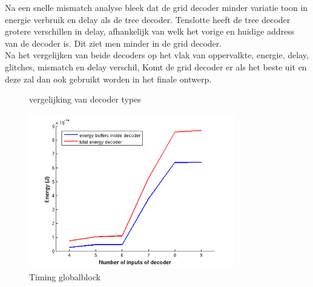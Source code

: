 Na een snelle mismatch analyse bleek dat de grid decoder minder variatie toon in energie verbruik en delay als de tree decoder. Tenslotte heeft de tree decoder grotere verschillen in delay, afhankelijk van welk het vorige en huidige address van de decoder is. Dit ziet men minder in de grid decoder. \\
Na het vergelijken van beide decoders op het vlak van oppervalkte, energie, delay, glitches, mismatch en delay verschil, Komt de grid decoder er als het beste uit en deze zal dan ook gebruikt worden in het finale ontwerp.


\begin{figure}[!ht]
\centering
{}
\caption{vergelijking van decoder types}
\end{figure}


\begin{figure}[!ht]
  \centering
  \includegraphics[width=0.8\textwidth]{../fig/hfdst-decoders-egrid.png}
  \caption{Timing globalblock}
  \label{fig:decoder_egrid}
\end{figure}

